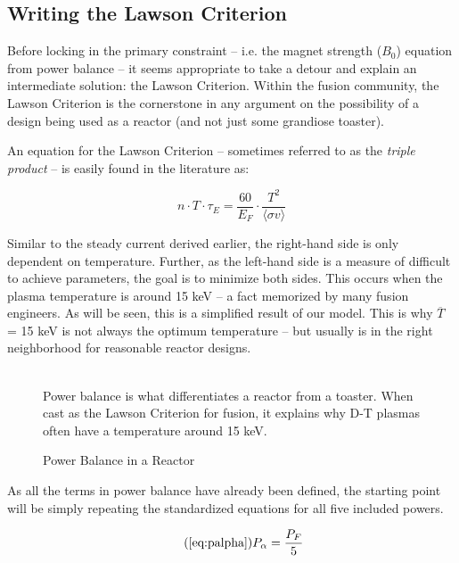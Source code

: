 \subsection{Writing the Lawson Criterion}

Before locking in the primary constraint -- i.e. the magnet strength ($B_0$) equation from power balance -- it seems appropriate to take a detour and explain an intermediate solution: the Lawson Criterion. Within the fusion community, the Lawson Criterion is the cornerstone in any argument on the possibility of a design being used as a reactor (and not just some grandiose toaster). 

An equation for the Lawson Criterion -- sometimes referred to as the \emph{triple product} -- is easily found in the literature as:

\begin{equation}
	\label{eq:lawson}
	n \cdot T \cdot \tau_E = \frac{ 60 }{ E_F } \cdot \frac{ T ^ 2 }{ \langle \sigma v \rangle }
\end{equation}

Similar to the steady current derived earlier, the right-hand side is only dependent on temperature. Further, as the left-hand side is a measure of difficult to achieve parameters, the goal is to minimize both sides. This occurs when the plasma temperature is around 15 keV -- a fact memorized by many fusion engineers. As will be seen, this is a simplified result of our model. This is why $\overline T$ = 15 keV is not always the optimum temperature -- but usually is in the right neighborhood for reasonable reactor designs.

\begin{figure}
	\centering
	\begin{adjustbox}{width=0.75\textwidth}
		
	\end{adjustbox}
	\caption{Power Balance in a Reactor} ~\\
	\small Power balance is what differentiates a reactor from a toaster. When cast as the Lawson Criterion for fusion, it explains why D-T plasmas often have a temperature around 15 keV.
\end{figure}

As all the terms in power balance have already been defined, the starting point will be simply repeating the standardized equations for all five included powers.

\begin{equation}
	\tag{\ref{eq:palpha}}
	P_\alpha = \frac{P_F}{5}
\end{equation}

